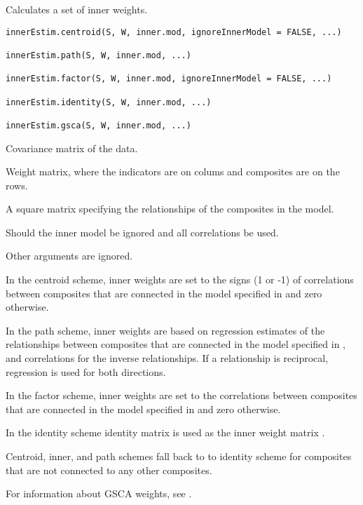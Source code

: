 \documentclass[a4paper]{book}
\begin{document}
%
\begin{Description}\relax
Calculates a set of inner weights.
\end{Description}
%
\begin{Usage}
\begin{verbatim}
innerEstim.centroid(S, W, inner.mod, ignoreInnerModel = FALSE, ...)

innerEstim.path(S, W, inner.mod, ...)

innerEstim.factor(S, W, inner.mod, ignoreInnerModel = FALSE, ...)

innerEstim.identity(S, W, inner.mod, ...)

innerEstim.gsca(S, W, inner.mod, ...)
\end{verbatim}
\end{Usage}
%
\begin{Arguments}
\begin{ldescription}
\item[\code{S}] Covariance matrix of the data.

\item[\code{W}] Weight matrix, where the indicators are on colums and composites are on the rows.

\item[\code{inner.mod}] A square matrix specifying the relationships of the composites in the model.

\item[\code{ignoreInnerModel}] Should the inner model be ignored and all correlations be used.

\item[\code{...}] Other arguments are ignored.
\end{ldescription}
\end{Arguments}
%
\begin{Details}\relax
In the centroid scheme, inner weights are set to the signs (1 or -1) of correlations between
composites that are connected in the model specified in  and zero otherwise.

In the path scheme, inner weights are based on regression estimates of the relationships between
composites that are connected in the model specified in , and correlations for
the inverse relationships. If a relationship is reciprocal, regression is used for both directions.

In the factor scheme, inner weights are set to the correlations between
composites that are connected in the model specified in  and zero otherwise.

In the identity scheme identity matrix is used as the inner weight matrix .

Centroid, inner, and path schemes fall back to to identity scheme for composites 
that are not connected to any other composites.

For information about GSCA weights, see .
\end{Details}
\end{document}
